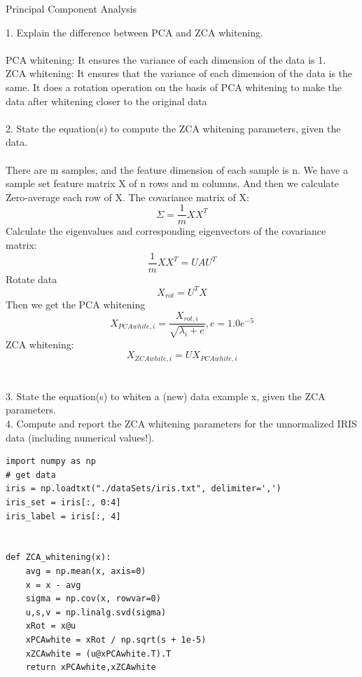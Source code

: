 \documentclass[
	ngerman,
	]{tudaexercise}
\begin{document}
\begin{task}{Principal Component Analysis}
\begin{subtask}
1. Explain the difference between PCA and ZCA whitening.\\
~\\
PCA whitening: It ensures the variance of each dimension of the data is 1.\\
ZCA whitening: It ensures that the variance of each dimension of the data is the same. It does a rotation operation on the basis of PCA whitening to make the data after whitening closer to the original data \\
~\\
2. State the equation(s) to compute the ZCA whitening parameters, given the data.\\
~\\
There are m samples, and the feature dimension of each sample is n. We have a sample set feature matrix X of n rows and m columns. And then we calculate Zero-average each row of X.
The covariance matrix of X:
\begin{equation}\Sigma=\frac{1}{m} X X^{T}\end{equation}
Calculate the eigenvalues and corresponding eigenvectors of the covariance matrix:
\begin{equation}\frac{1}{m} X X^{T}=U A U^{T}\end{equation}
Rotate data
\begin{equation}X_{rot}=U^{T} X\end{equation}
Then we get the PCA whitening	
\begin{equation}X_{PCAwhite, i}=\frac{X_{rot, i}}{\sqrt{\lambda_{i}+e}}, e=1.0 e^{-5}\end{equation}
ZCA whitening:
\begin{equation}X_{ZCAwhite, i}=U X_{PCAwhite, i}\end{equation}\\
~\\
3. State the equation(s) to whiten a (new) data example x, given the ZCA parameters. 
 ~\\
4. Compute and report the ZCA whitening parameters for the unnormalized IRIS data (including numerical values!).\\
\begin{lstlisting}
import numpy as np
# get data
iris = np.loadtxt("./dataSets/iris.txt", delimiter=',')
iris_set = iris[:, 0:4]
iris_label = iris[:, 4]


def ZCA_whitening(x):
    avg = np.mean(x, axis=0)
    x = x - avg
    sigma = np.cov(x, rowvar=0)
    u,s,v = np.linalg.svd(sigma)
    xRot = x@u
    xPCAwhite = xRot / np.sqrt(s + 1e-5)
    xZCAwhite = (u@xPCAwhite.T).T
    return xPCAwhite,xZCAwhite



\end{lstlisting}
\end{subtask}
\end{task}
\end{document}
